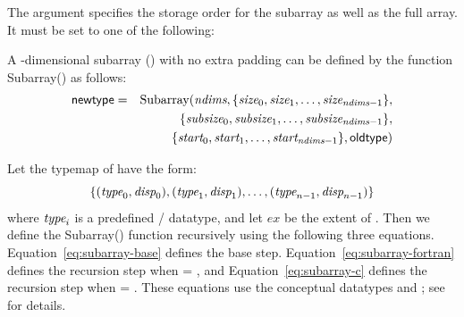 The  argument specifies the storage order for the
subarray as well as the full array.
It must be set to one
of the following:
\begin{constlist}
\end{constlist}

A -dimensional subarray () with no
extra padding can be defined by the function Subarray() as
follows:
\begin{eqnarray*}
\mpiarg{newtype} & = &  \mbox{Subarray}( \mword{ndims},
                        \{\mword{size}_0, \mword{size}_1,\ldots,\mword{size}_{\msword{ndims}-1}\},        \\
                 &   &  \{\mword{subsize}_0, \mword{subsize}_1,\ldots,\mword{subsize}_{\msword{ndims}-1}\}, \\
                 &   &  \{\mword{start}_0, \mword{start}_1,\ldots,\mword{start}_{\msword{ndims}-1}\},
                        {\mpiarg{oldtype}} )
\end{eqnarray*}

Let the typemap of  have the form:
\begin{displaymath}
\{(\textrm{\itshape{type}}_0,\textrm{\itshape{disp}}_0),(\textrm{\itshape{type}}_1,\textrm{\itshape{disp}}_1),\ldots,(\textrm{\itshape{type}}_{n-1},\textrm{\itshape{disp}}_{n-1})\}
\end{displaymath}
where $\textrm{\itshape{type}}_i$ is a predefined \MPI/ datatype, and let $ex$ be the
extent of .  Then we define the Subarray() function
recursively using the following three equations.
Equation~\ref{eq:subarray-base} defines the base step.
Equation~\ref{eq:subarray-fortran} defines the recursion step when
 = , and
Equation~\ref{eq:subarray-c} defines the recursion step when
 = .
These equations use the conceptual datatypes 
and ; see  for details.

